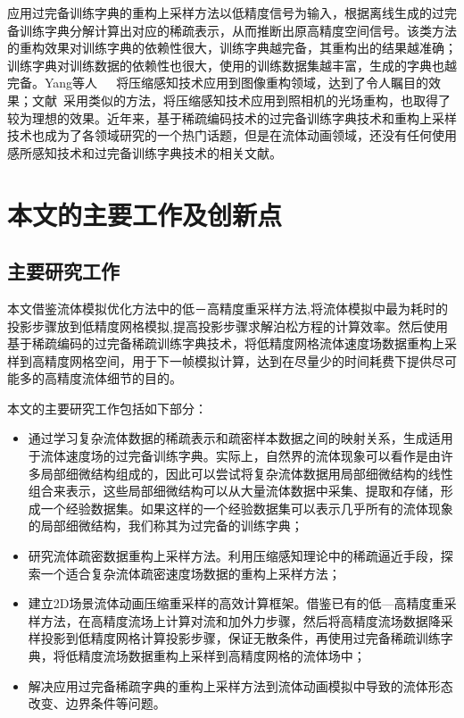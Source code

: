 应用过完备训练字典的重构上采样方法以低精度信号为输入，根据离线生成的过完备训练字典分解计算出对应的稀疏表示，从而推断出原高精度空间信号。该类方法的重构效果对训练字典的依赖性很大，训练字典越完备，其重构出的结果越准确；训练字典对训练数据的依赖性也很大，使用的训练数据集越丰富，生成的字典也越完备。Yang等人~\cite{yang2010image}~\cite{yang2008image}~\cite{yang2012coupled}将压缩感知技术应用到图像重构领域，达到了令人瞩目的效果；文献~\cite{marwah2013compressive}采用类似的方法，将压缩感知技术应用到照相机的光场重构，也取得了较为理想的效果。近年来，基于稀疏编码技术的过完备训练字典技术和重构上采样技术也成为了各领域研究的一个热门话题，但是在流体动画领域，还没有任何使用感所感知技术和过完备训练字典技术的相关文献。

\section{本文的主要工作及创新点}
\label{sec:creation}

\subsection{主要研究工作}

本文借鉴流体模拟优化方法中的低－高精度重采样方法,将流体模拟中最为耗时的投影步骤放到低精度网格模拟,提高投影步骤求解泊松方程的计算效率。然后使用基于稀疏编码的过完备稀疏训练字典技术，将低精度网格流体速度场数据重构上采样到高精度网格空间，用于下一帧模拟计算，达到在尽量少的时间耗费下提供尽可能多的高精度流体细节的目的。

本文的主要研究工作包括如下部分：
\begin{itemize}
\item 通过学习复杂流体数据的稀疏表示和疏密样本数据之间的映射关系，生成适用于流体速度场的过完备训练字典。实际上，自然界的流体现象可以看作是由许多局部细微结构组成的，因此可以尝试将复杂流体数据用局部细微结构的线性组合来表示，这些局部细微结构可以从大量流体数据中采集、提取和存储，形成一个经验数据集。如果这样的一个经验数据集可以表示几乎所有的流体现象的局部细微结构，我们称其为过完备的训练字典；
\item 研究流体疏密数据重构上采样方法。利用压缩感知理论中的稀疏逼近手段，探索一个适合复杂流体疏密速度场数据的重构上采样方法；
\item 建立2D场景流体动画压缩重采样的高效计算框架。借鉴已有的低—高精度重采样方法，在高精度流场上计算对流和加外力步骤，然后将高精度流场数据降采样投影到低精度网格计算投影步骤，保证无散条件，再使用过完备稀疏训练字典，将低精度流场数据重构上采样到高精度网格的流体场中；
\item 解决应用过完备稀疏字典的重构上采样方法到流体动画模拟中导致的流体形态改变、边界条件等问题。
\end{itemize}

